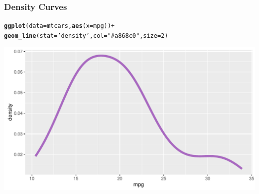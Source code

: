 \documentclass[12pt]{beamer}\usepackage[]{graphicx}\usepackage[]{color}
\makeatletter
\newcommand{\hlnum}[1]{\textcolor[rgb]{0.686,0.059,0.569}{#1}}%
\newcommand{\hlstr}[1]{\textcolor[rgb]{0.192,0.494,0.8}{#1}}%
\newcommand{\hlopt}[1]{\textcolor[rgb]{0,0,0}{#1}}%
\newcommand{\hlstd}[1]{\textcolor[rgb]{0.345,0.345,0.345}{#1}}%
\newcommand{\hlkwc}[1]{\textcolor[rgb]{0.333,0.667,0.333}{#1}}%
\newcommand{\hlkwd}[1]{\textcolor[rgb]{0.737,0.353,0.396}{\textbf{#1}}}%
\newenvironment{kframe}{%
 \def\at@end@of@kframe{}%
 \ifinner\ifhmode%
  \def\at@end@of@kframe{\end{minipage}}%
  \begin{minipage}{\columnwidth}%
 \fi\fi%
 \def\FrameCommand##1{\hskip\@totalleftmargin \hskip-\fboxsep
 \colorbox{shadecolor}{##1}\hskip-\fboxsep
     \hskip-\linewidth \hskip-\@totalleftmargin \hskip\columnwidth}%
 \MakeFramed {\advance\hsize-\width
   \@totalleftmargin\z@ \linewidth\hsize
   \@setminipage}}%
 {\par\unskip\endMakeFramed%
 \at@end@of@kframe}
\newenvironment{knitrout}{}{} %
\makeatother
\begin{document}
\begin{frame}[fragile]
\frametitle{Density Curves}

\begin{knitrout}\scriptsize
{}\color{fgcolor}\begin{kframe}
\begin{alltt}
\hlkwd{ggplot}\hlstd{(}\hlkwc{data} \hlstd{= mtcars,} \hlkwd{aes}\hlstd{(}\hlkwc{x} \hlstd{= mpg))} \hlopt{+}
  \hlkwd{geom_line}\hlstd{(}\hlkwc{stat} \hlstd{=} \hlstr{'density'}\hlstd{,} \hlkwc{col} \hlstd{=} \hlstr{"#a868c0"}\hlstd{,} \hlkwc{size} \hlstd{=} \hlnum{2}\hlstd{)}
\end{alltt}
\end{kframe}

{\centering \includegraphics[width=.9\linewidth,height=.5\linewidth]{figure/unnamed-chunk-23-1} 

}



\end{knitrout}

\end{frame}

\end{document}
